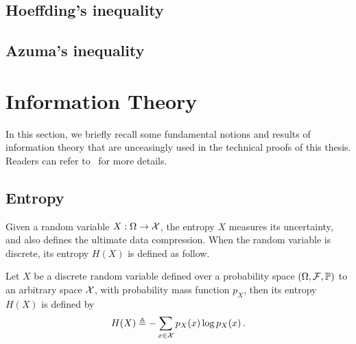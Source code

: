 \subsection{Hoeffding's inequality}

\subsection{Azuma's inequality}



\section{Information Theory}\label{app:maths.information}

In this section, we briefly recall some fundamental notions and results of information theory that are unceasingly used in the technical proofs of this thesis. Readers can refer to~\cite{cover2006} for more details.

\subsection{Entropy}\label{app:maths.information.entropy}

Given a random variable $X: \Omega \rightarrow \mathcal{X}$, the \gls{entropy} $X$ measures its uncertainty, and also defines the ultimate data compression. When the random variable is discrete, its entropy $H(X)$ is defined as follow.

\begin{definition}[entropy]\label{def:entropy}
\begin{leftbar}[defnbar]
    Let $X$ be a discrete random variable defined over a probability space $(\Omega,\mathcal{F},\mathbb{P})$ to an arbitrary space $\mathcal{X}$, with probability mass function $p_X$, then its entropy $H(X)$ is defined by
    \[
        H(X) \triangleq - \sum_{x\in\mathcal{X}} p_X(x)\log p_X(x)\,.
    \]
\end{leftbar}
\end{definition}

